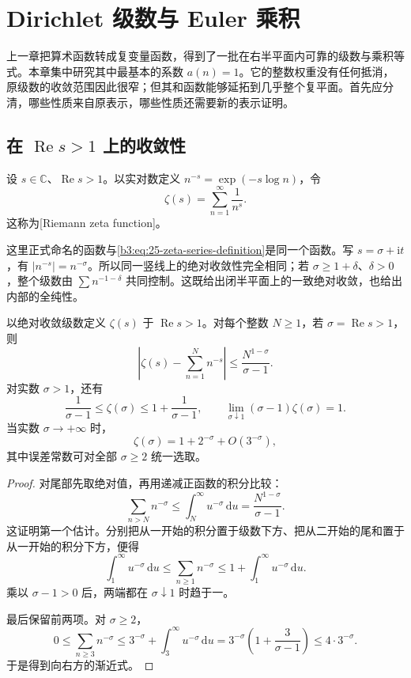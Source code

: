 \section{Dirichlet 级数与 Euler 乘积}
\label{b3:sec:2601}

上一章把算术函数转成复变量函数，得到了一批在右半平面内可靠的级数与乘积等式。本章集中研究其中最基本的系数 \(a(n)=1\)。它的整数权重没有任何抵消，原级数的收敛范围因此很窄；但其和函数能够延拓到几乎整个复平面。首先应分清，哪些性质来自原表示，哪些性质还需要新的表示证明。

\subsection{在 \texorpdfstring{\(\operatorname{Re}s>1\)}{Re(s)>1} 上的收敛性}
\label{b3:subsec:260101}

\begin{definition}\label{b3:def:26-zeta}
设 \(s\in\mathbb C\)、\(\operatorname{Re}s>1\)。以实对数定义 \(n^{-s}=\exp(-s\log n)\)，令
\[
 \zeta(s)=\sum_{n=1}^{\infty}\frac1{n^s}.
\]
这称为[Riemann zeta function]。
\end{definition}

这里正式命名的函数与\eqref{b3:eq:25-zeta-series-definition}是同一个函数。写 \(s=\sigma+\mathrm it\)，有 \(|n^{-s}|=n^{-\sigma}\)。所以同一竖线上的绝对收敛性完全相同；若 \(\sigma\ge1+\delta\)、\(\delta>0\)，整个级数由 \(\sum n^{-1-\delta}\) 共同控制。这既给出闭半平面上的一致绝对收敛，也给出内部的全纯性。

\begin{proposition}[级数尾界与实轴极限]\label{b3:prop:26-series-estimates}
以绝对收敛级数定义 \(\zeta(s)\) 于 \(\operatorname{Re}s>1\)。对每个整数 \(N\ge1\)，若 \(\sigma=\operatorname{Re}s>1\)，则
\[
 \left|\zeta(s)-\sum_{n=1}^{N}n^{-s}\right|
 \le\frac{N^{1-\sigma}}{\sigma-1}.
\]
对实数 \(\sigma>1\)，还有
\[
 \frac1{\sigma-1}\le\zeta(\sigma)\le1+\frac1{\sigma-1},
 \qquad
 \lim_{\sigma\downarrow1}(\sigma-1)\zeta(\sigma)=1.
\]
当实数 \(\sigma\to+\infty\) 时，
\[
 \zeta(\sigma)=1+2^{-\sigma}+O(3^{-\sigma}),
\]
其中误差常数可对全部 \(\sigma\ge2\) 统一选取。
\end{proposition}
\begin{proof}
对尾部先取绝对值，再用递减正函数的积分比较：
\[
 \sum_{n>N}n^{-\sigma}\le\int_N^\infty u^{-\sigma}\,\mathrm du
 =\frac{N^{1-\sigma}}{\sigma-1}.
\]
这证明第一个估计。分别把从一开始的积分置于级数下方、把从二开始的尾和置于从一开始的积分下方，便得
\[
 \int_1^\infty u^{-\sigma}\,\mathrm du
 \le\sum_{n\ge1}n^{-\sigma}
 \le1+\int_1^\infty u^{-\sigma}\,\mathrm du.
\]
乘以 \(\sigma-1>0\) 后，两端都在 \(\sigma\downarrow1\) 时趋于一。

最后保留前两项。对 \(\sigma\ge2\)，
\[
 0\le\sum_{n\ge3}n^{-\sigma}
 \le3^{-\sigma}+\int_3^\infty u^{-\sigma}\,\mathrm du
 =3^{-\sigma}\left(1+\frac3{\sigma-1}\right)
 \le4\cdot3^{-\sigma}.
\]
于是得到向右方的渐近式。
\end{proof}

